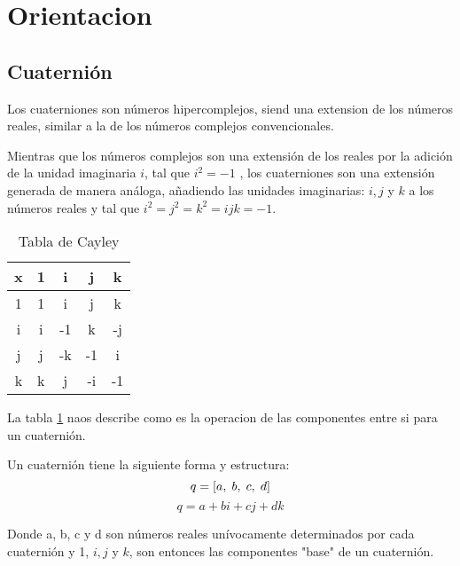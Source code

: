 
\section{Orientacion}

    \subsection{Cuaternión}
        Los cuaterniones son números hipercomplejos, siend una extension de los números reales, similar a la de los números complejos convencionales.
        
        Mientras que los números complejos son una extensión de los reales por la adición de la unidad imaginaria \textbf{$ i $}, tal que \textbf{$ i^2 = -1 $}
        , los cuaterniones son una extensión generada de manera análoga, añadiendo las unidades imaginarias: $i, j$ y $ k $ a los números reales 
        y tal que $ i^2 = j^2 = k^2 = ijk = -1$.

            \begin{table}[htp]
                \centering
                    \begin{tabular}{|c|c|c|c|c|}
                        \hline
                        \textbf{x} & 1 & i  & j  & k \\ \hline
                             1 & 1 & i  & j  & k \\ \hline
                             i & i & -1 & k  & -j \\ \hline
                             j & j & -k & -1 & i \\ \hline
                             k & k & j  & -i & -1 \\ 
                        \hline
                    \end{tabular}
                \caption{Tabla de Cayley}
                \label{table: Cayley}
            \end{table}

        La tabla \ref{table: Cayley} naos describe como es la operacion de las componentes entre si para un cuaternión.

        Un cuaternión tiene la siguiente forma y estructura:
        $$ q = [a, \hspace{1mm} b, \hspace{1mm} c, \hspace{1mm} d]$$
        $$ q = a + bi +cj + dk $$

        Donde a, b, c y d son números reales unívocamente determinados por cada cuaternión y 
        1, $ i, j $ y $ k $, son entonces las componentes "base" de un cuaternión.

